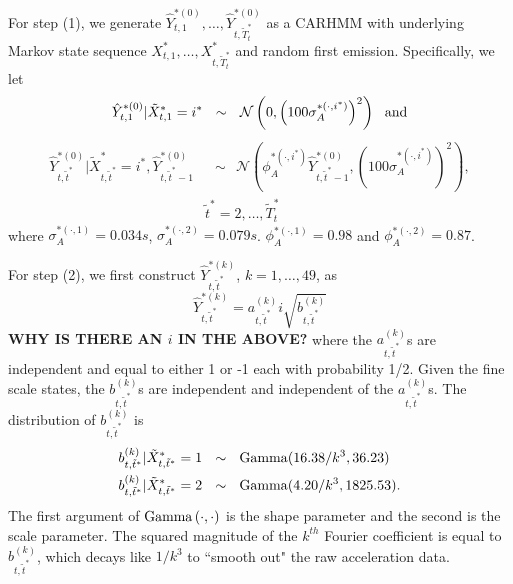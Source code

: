 For step (1), we generate $\hat Y^{*(0)}_{t,1}, \ldots, \hat Y^{*(0)}_{t,\tilde T_t^*}$  as a CARHMM with underlying Markov state sequence $X^{*}_{t,1}, \ldots, X^{*}_{t,\tilde T_t^*}$ and random first emission.  Specifically, we let
   \[
    	\hat{Y}^{*(0)}_{t,1}|\tilde X^*_{t,1} = i^* ~~\sim~~ \mathcal{N} \left(0, \left(100\sigma_A^{*(\cdot,i^*)}\right)^2 \right)
    	~~{\rm{and}}
   \]
     \begin{align}	
       \hat{Y}^{*(0)}_{t,\tilde t^*}|\tilde X^*_{t,\tilde t^*} = i^*,\hat{Y}^{*(0)}_{t,\tilde t^*-1}
       &~~\sim ~~\mathcal{N} \left(\phi_A^{*(\cdot,i^*)} \hat{Y}^{*(0)}_{t,\tilde t^*-1}, \left(100\sigma_A^{*(\cdot,i^*)}\right)^2 \right), \label{eqn:yhat_0} \\
        &\tilde t^* = 2,\ldots, \tilde T^*_t
    	\nonumber
    \end{align}
    where $\sigma_A^{*(\cdot,1)} = 0.034s$,  $\sigma_A^{*(\cdot,2)} = 0.079s$. $\phi_A^{*(\cdot,1)} = 0.98$ and $\phi_A^{*(\cdot,2)} = 0.87$. 
  
 For step (2),
 we first construct $\hat{Y}^{*(k)}_{t,\tilde t^*}$, $k=1,\ldots, 49$, as
    \begin{equation}
        \hat{Y}^{*(k)}_{t,\tilde t^*} = a_{t,\tilde t^*}^{(k)} i\sqrt{b^{(k)}_{t,\tilde t^*}}
        \label{eqn:abYhat}
    \end{equation}
    {\bf{WHY IS THERE AN $i$ IN THE ABOVE?}}
     where the $a^{(k)}_{t,\tilde t^*}$s are independent and equal to either 1 or -1 each with probability 1/2.
    Given the fine scale states, the $b^{(k)}_{t,\tilde t^*}$s are independent  and independent of the  $a^{(k)}_{t,\tilde t^*}$s.  
   The distribution of $b^{(k)}_{t,\tilde t^*}$ is
    \begin{align}
    \begin{split}
    	b^{(k)}_{t,\tilde t^*}|\tilde X^*_{t,\tilde t^*} = 1 &~~\sim~~ {\rm{Gamma}}(16.38/k^3, 36.23) \\
    	b^{(k)}_{t,\tilde t^*}|\tilde X^*_{t,\tilde t^*} = 2  &~~\sim ~~{\rm{Gamma}}(4.20/k^3, 1825.53). \\ 
    \end{split}
    \label{eqn:bdist}
    \end{align}
    The first argument of ${\rm{Gamma}}\left(\cdot,\cdot\right)$ is the shape parameter and the second is the scale parameter. The squared magnitude of the $k^{th}$ Fourier coefficient is equal to $b^{(k)}_{t,\tilde t^*}$, which decays like $1/k^3$ to ``smooth out" the raw acceleration data.
    
